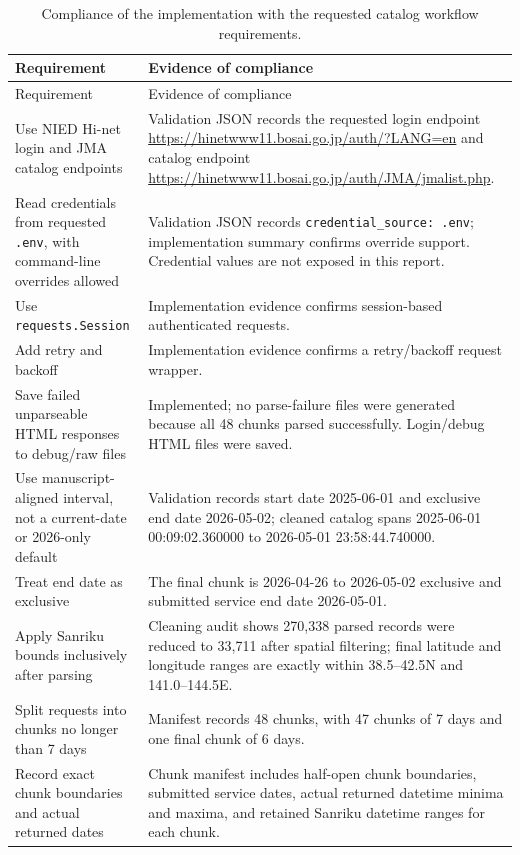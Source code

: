 \documentclass[11pt]{article}
\begin{document}
\begin{longtable}{>{\raggedright\arraybackslash}p{}>{\raggedright\arraybackslash}p{}}
\caption{Compliance of the implementation with the requested catalog workflow requirements.}\label{tab:compliance}\\
\toprule
Requirement & Evidence of compliance \\
\midrule
\endfirsthead
\toprule
Requirement & Evidence of compliance \\
\midrule
\endhead
Use NIED Hi-net login and JMA catalog endpoints & Validation JSON records the requested login endpoint \url{https://hinetwww11.bosai.go.jp/auth/?LANG=en} and catalog endpoint \url{https://hinetwww11.bosai.go.jp/auth/JMA/jmalist.php}. \\
Read credentials from requested \texttt{.env}, with command-line overrides allowed & Validation JSON records \texttt{credential\_source: .env}; implementation summary confirms override support. Credential values are not exposed in this report. \\
Use \texttt{requests.Session} & Implementation evidence confirms session-based authenticated requests. \\
Add retry and backoff & Implementation evidence confirms a retry/backoff request wrapper. \\
Save failed unparseable HTML responses to debug/raw files & Implemented; no parse-failure files were generated because all 48 chunks parsed successfully. Login/debug HTML files were saved. \\
Use manuscript-aligned interval, not a current-date or 2026-only default & Validation records start date 2025-06-01 and exclusive end date 2026-05-02; cleaned catalog spans 2025-06-01 00:09:02.360000 to 2026-05-01 23:58:44.740000. \\
Treat end date as exclusive & The final chunk is 2026-04-26 to 2026-05-02 exclusive and submitted service end date 2026-05-01. \\
Apply Sanriku bounds inclusively after parsing & Cleaning audit shows 270,338 parsed records were reduced to 33,711 after spatial filtering; final latitude and longitude ranges are exactly within 38.5--42.5\textdegree{}N and 141.0--144.5\textdegree{}E. \\
Split requests into chunks no longer than 7 days & Manifest records 48 chunks, with 47 chunks of 7 days and one final chunk of 6 days. \\
Record exact chunk boundaries and actual returned dates & Chunk manifest includes half-open chunk boundaries, submitted service dates, actual returned datetime minima and maxima, and retained Sanriku datetime ranges for each chunk. \\

\end{longtable}
\end{document}
